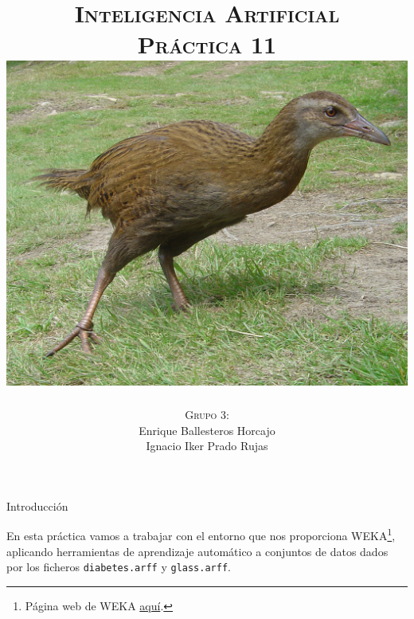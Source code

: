 \documentclass[11pt, a4paper, spanish, openright, twoside]{book}
\begin{document}
 
\title{\Huge{\textsc{Inteligencia Artificial}} \\
	\vspace{0.7cm}
	 \textsc{\Large{Práctica 11}} \\
	\vspace{1.5cm}
	\includegraphics[scale=0.2]{weka}
	}
\author{\textsc{Grupo 3:}\\
	Enrique Ballesteros Horcajo\\
	Ignacio Iker Prado Rujas}
\date{\Today}
\maketitle

\newpage
\mbox{}
\thispagestyle{empty}						%
\newpage


\tableofcontents 							%

\newpage
\mbox{}
\thispagestyle{empty}						%
\newpage


\vspace{3cm}


\newpage

\begin{section}{Introducción}
	
	En esta práctica vamos a trabajar con el entorno que nos proporciona WEKA\footnote{Página web de WEKA \href{http://www.cs.waikato.ac.nz/ml/weka/}{aquí}.}, aplicando herramientas de aprendizaje automático a conjuntos de datos dados por los ficheros \texttt{diabetes.arff} y \texttt{glass.arff}.
	
\end{section}
\end{document}
